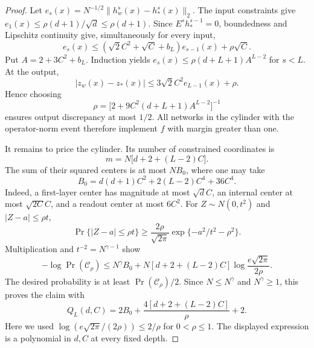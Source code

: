 \begin{proof}
Let $e_s(x)=N^{-1/2}\|h^s_w(x)-h^s_*(x)\|_2$. The input constraints give
$e_1(x)\leq\rho(d+1)/\sqrt d\leq\rho(d+1)$. Since $E^sh^{s-1}_*=0$,
boundedness and Lipschitz continuity give, simultaneously for every input,
\[
 e_s(x)\leq (\sqrt2 C^2+\sqrt C+b_L)e_{s-1}(x)+\rho\sqrt C.
\]
Put $A=2+3C^2+b_L$. Induction yields
$e_s(x)\leq\rho(d+L+1)A^{L-2}$ for $s<L$. At the output,
\[
 |z_w(x)-z_*(x)|
 \leq3\sqrt2 C^2 e_{L-1}(x)+\rho.
\]
Hence choosing
\[
 \rho=\bigl[2+9C^2(d+L+1)A^{L-2}\bigr]^{-1}
\]
ensures output discrepancy at most $1/2$. All networks in the cylinder with
the operator-norm event therefore implement $f$ with margin greater than one.

It remains to price the cylinder. Its number of constrained coordinates is
\[
 m=N\bigl[d+2+(L-2)C\bigr].
\]
The sum of their squared centers is at most $NB_0$, where one may take
\[
 B_0=d(d+1)C^2+2(L-2)C^4+36C^4.
\]
Indeed, a first-layer center has magnitude at most $\sqrt d C$, an internal
center at most $\sqrt{2C}C$, and a readout center at most $6C^2$.
For $Z\sim N(0,t^2)$ and $|Z-a|\leq\rho t$,
\[
 \Pr\{|Z-a|\leq\rho t\}
 \geq\frac{2\rho}{\sqrt{2\pi}}
       \exp\{-a^2/t^2-\rho^2\}.
\]
Multiplication and $t^{-2}=N^{\gamma-1}$ show
\[
 -\log\Pr(\mathcal C_\rho)
 \leq N^\gamma B_0
 +N[d+2+(L-2)C]\log\frac{e\sqrt{2\pi}}{2\rho}.
\]
The desired probability is at least $\Pr(\mathcal C_\rho)/2$. Since
$N\leq N^\gamma$ and $N^\gamma\geq1$, this proves the claim with
\[
 Q_L(d,C)=2B_0+\frac{4[d+2+(L-2)C]}{\rho}+2.
\]
Here we used $\log(e\sqrt{2\pi}/(2\rho))\leq2/\rho$ for $0<\rho\leq1$.
The displayed expression is a polynomial in $d,C$ at every fixed depth.
\end{proof}
